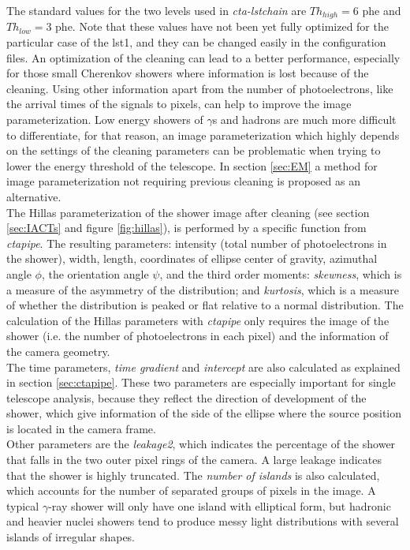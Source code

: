 \documentclass[main.tex]{subfiles}
\begin{document}
   The standard values for the two levels used in \textit{cta-lstchain} are $Th_{high} = 6$ phe and $Th_{low} = 3$ phe. Note that these values have not been yet fully optimized for the particular case of the \gls{lst}1, and they can be changed easily in the configuration files. An optimization of the cleaning can lead to a better performance, especially for those small Cherenkov showers where information is lost because of the cleaning. Using other information apart from the number of photoelectrons, like the arrival times of the signals to pixels, can help to improve the image parameterization. Low energy showers of $\gamma$s and hadrons are much more difficult to differentiate, for that reason, an image parameterization which highly depends on the settings of the cleaning parameters can be problematic when trying to lower the energy threshold of the telescope. In section \ref{sec:EM} a method for image parameterization not requiring previous cleaning is proposed as an alternative.\\
   The Hillas parameterization of the shower image after cleaning (see section \ref{sec:IACTs} and figure \ref{fig:hillas}), is performed by a specific function from \textit{ctapipe}. The resulting parameters: intensity (total number of photoelectrons in the shower), width, length, coordinates of ellipse center of gravity, azimuthal angle $\phi$, the orientation angle $\psi$, and the third order moments: \textit{skewness}, which is a measure of the asymmetry of the distribution; and \textit{kurtosis}, which is a measure of whether the distribution is peaked or flat relative to a normal distribution. The calculation of the Hillas parameters with \textit{ctapipe} only requires the image of the shower (i.e. the number of photoelectrons in each pixel) and the information of the camera geometry.\\
   The time parameters, \textit{time gradient} and \textit{intercept} are also calculated as explained in section \ref{sec:ctapipe}. These two parameters are especially important for single telescope analysis, because they reflect the direction of development of the shower, which give information of the side of the ellipse where the source position is located in the camera frame.\\
   Other parameters are the \textit{leakage2}, which indicates the percentage of the shower that falls in the two outer pixel rings of the camera. A large leakage indicates that the shower is highly truncated. The \textit{number of islands} is also calculated, which accounts for the number of separated groups of pixels in the image. A typical $\gamma$-ray shower will only have one island with elliptical form, but hadronic and heavier nuclei showers tend to produce messy light distributions with several islands of irregular shapes.\\
   
\end{document}
